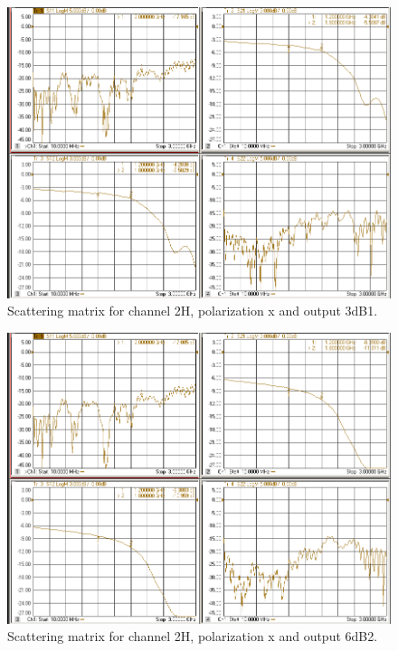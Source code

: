 \documentclass[12pt,a4paper,oneside]{article}
\begin{document}
\begin{figure}[H]
\centering
\includegraphics[width=0.9\linewidth]{VNA_results/2Hx_3dB1.png}
\caption{Scattering matrix for channel 2H, polarization x and output 3dB1.}
\label{fig:2Hx_3dB1}
\end{figure}


\begin{figure}[H]
\centering
\includegraphics[width=0.9\linewidth]{VNA_results/2Hx_6dB2.png}
\caption{Scattering matrix for channel 2H, polarization x and output 6dB2.}
\label{fig:2Hx_6dB2}
\end{figure}
\end{document}
